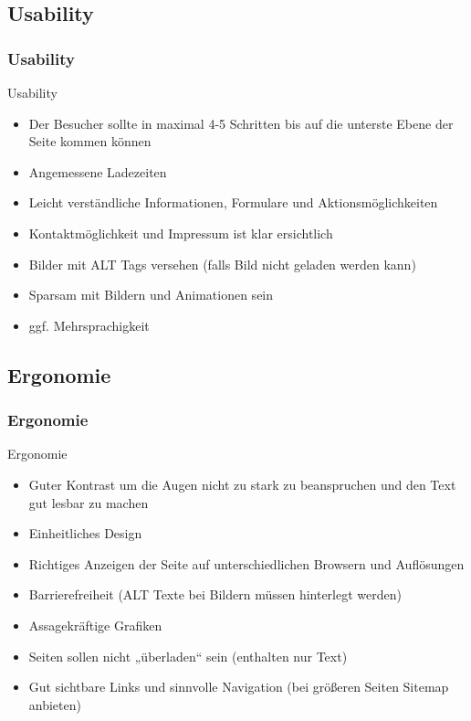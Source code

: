 \documentclass[xcolor=dvipsnames]{beamer}
\begin{document}
\subsection{Usability}
\begin{frame} %
  \frametitle{Usability} %
  \begin{block}{Usability}
	\begin{itemize}
		\item Der Besucher sollte in maximal 4-5 Schritten bis auf die unterste Ebene der Seite kommen können
		\item Angemessene Ladezeiten
		\item Leicht verständliche Informationen, Formulare und Aktionsmöglichkeiten
		\item Kontaktmöglichkeit und Impressum ist klar ersichtlich
		\item Bilder mit ALT Tags versehen (falls Bild nicht geladen werden kann)
		\item Sparsam mit Bildern und Animationen sein
		\item ggf. Mehrsprachigkeit
	\end{itemize}
  \end{block}
\end{frame}

\subsection{Ergonomie}
\begin{frame} %
  \frametitle{Ergonomie} %
  \begin{block}{Ergonomie}
	\begin{itemize}
		\item Guter Kontrast um die Augen nicht zu stark zu beanspruchen und den Text gut lesbar zu machen
		\item Einheitliches Design
		\item Richtiges Anzeigen der Seite auf unterschiedlichen Browsern und Auflösungen
		\item Barrierefreiheit (ALT Texte bei Bildern müssen hinterlegt werden)
		\item Assagekräftige Grafiken
		\item Seiten sollen nicht „überladen“ sein (enthalten nur Text)
		\item Gut sichtbare Links und sinnvolle Navigation (bei größeren Seiten Sitemap anbieten)
	\end{itemize}
  \end{block}
\end{frame}
\end{document}
